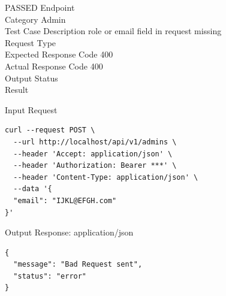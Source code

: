 \begin{testcase}{32}{PASSED}
Endpoint \hfill {}\\
Category \hfill Admin\\
Test Case Description \hfill role or email field in request missing\\

Request Type    \hfill {}\\
Expected Response Code    \hfill 400\\
Actual Response Code    \hfill 400\\

Output Status \hfill {}\\
Result \hfill {}

\begin{ipblock}{Input Request}
\begin{verbatim}
curl --request POST \
  --url http://localhost/api/v1/admins \
  --header 'Accept: application/json' \
  --header 'Authorization: Bearer ***' \
  --header 'Content-Type: application/json' \
  --data '{
  "email": "IJKL@EFGH.com"
}'
\end{verbatim}
\end{ipblock}

\begin{opblock}{Output Response: application/json}
\begin{verbatim}
{
  "message": "Bad Request sent",
  "status": "error"
}
\end{verbatim}
\end{opblock}
\end{testcase}

